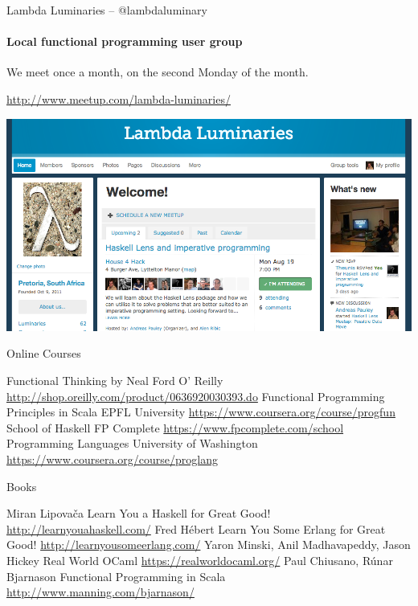\documentclass[mathserif]{beamer}
\begin{document}
\begin{frame}{Lambda Luminaries -- @lambdaluminary}
  \framesubtitle{Local functional programming user group}
  We meet once a month, on the second Monday of the month.

  \url{http://www.meetup.com/lambda-luminaries/}
  \begin{center}
    \includegraphics[scale=0.3]{img/LambdaLuminariesScreenShot2013-08-09.png}
  \end{center}
\end{frame}

\begin{frame}{Online Courses}

  \begin{thebibliography}{10}
      Functional Thinking by Neal Ford
      \newblock O' Reilly
      \newblock \url{http://shop.oreilly.com/product/0636920030393.do}
      Functional Programming Principles in Scala
      \newblock EPFL University
      \newblock \url{https://www.coursera.org/course/progfun}
      School of Haskell
      \newblock FP Complete
      \newblock \url{https://www.fpcomplete.com/school}
      Programming Languages
      \newblock University of Washington
      \newblock \url{https://www.coursera.org/course/proglang}
  \end{thebibliography}

\end{frame}

\begin{frame}{Books}

  \begin{thebibliography}{10}
      Miran Lipovača
      \newblock Learn You a Haskell for Great Good!
      \newblock \url{http://learnyouahaskell.com/}
      Fred Hébert
      \newblock Learn You Some Erlang for Great Good!
      \newblock \url{http://learnyousomeerlang.com/}
      Yaron Minski, Anil Madhavapeddy, Jason Hickey
      \newblock Real World OCaml
      \newblock \url{https://realworldocaml.org/}
      Paul Chiusano, Rúnar Bjarnason
      \newblock Functional Programming in Scala
      \newblock \url{http://www.manning.com/bjarnason/}
  \end{thebibliography}

\end{frame}
\end{document}
